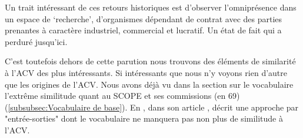 Un trait intéressant de ces retours historiques est d'observer l'omniprésence dans un espace de `recherche', d'organismes dépendant de contrat avec des parties prenantes à caractère industriel, commercial et lucratif.
Un état de fait qui a perduré jusqu'ici.

C'est toutefois dehors de cette parution nous trouvons des éléments de similarité à l'ACV des plus intéressants.
Si intéressants que nous n'y voyons rien d'autre que les origines de l'ACV.
Nous avons déjà vu dans la section sur le vocabulaire l’extrême similitude quant au SCOPE et ses commissions (en 69) (\ref{subsubsec:Vocabulaire de base}).
En \citeyear{leontief_environmental_1970}, dans son article ,  \citeauthor{leontief_environmental_1970} décrit une approche par "entrée-sorties" dont le vocabulaire ne manquera pas non plus de similitude à l'ACV.

